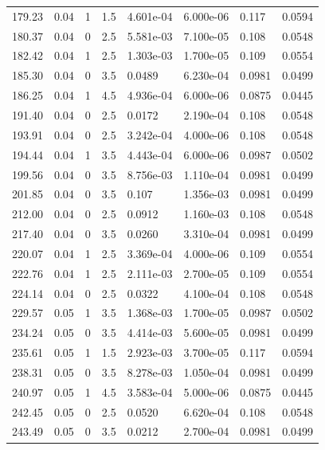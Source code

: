\documentclass[preview]{standalone}
\begin{document}
{{{\begin{tabular}{L{1.2cm}C{1.2cm} C{0.3cm}C{0.5cm} C{1.4cm}C{1.4cm} C{1.4cm}C{1.4cm}}
  179.23  &  0.04  & 1     & 1.5 &  4.601e-04  & 6.000e-06  & 0.117 &  0.0594   \\ 
  180.37  &  0.04  & 0     & 2.5 &  5.581e-03  & 7.100e-05  & 0.108 &  0.0548   \\ 
  182.42  &  0.04  & 1     & 2.5 &  1.303e-03  & 1.700e-05  & 0.109 &  0.0554   \\ 
  185.30  &  0.04  & 0     & 3.5 &  0.0489  & 6.230e-04  & 0.0981 &  0.0499   \\ 
  186.25  &  0.04  & 1     & 4.5 &  4.936e-04  & 6.000e-06  & 0.0875 &  0.0445   \\ 
  191.40  &  0.04  & 0     & 2.5 &  0.0172  & 2.190e-04  & 0.108 &  0.0548   \\ 
  193.91  &  0.04  & 0     & 2.5 &  3.242e-04  & 4.000e-06  & 0.108 &  0.0548   \\ 
  194.44  &  0.04  & 1     & 3.5 &  4.443e-04  & 6.000e-06  & 0.0987 &  0.0502   \\ 
  199.56  &  0.04  & 0     & 3.5 &  8.756e-03  & 1.110e-04  & 0.0981 &  0.0499   \\ 
  201.85  &  0.04  & 0     & 3.5 &  0.107  & 1.356e-03  & 0.0981 &  0.0499   \\ 
  212.00  &  0.04  & 0     & 2.5 &  0.0912  & 1.160e-03  & 0.108 &  0.0548   \\ 
  217.40  &  0.04  & 0     & 3.5 &  0.0260  & 3.310e-04  & 0.0981 &  0.0499   \\ 
  220.07  &  0.04  & 1     & 2.5 &  3.369e-04  & 4.000e-06  & 0.109 &  0.0554   \\ 
  222.76  &  0.04  & 1     & 2.5 &  2.111e-03  & 2.700e-05  & 0.109 &  0.0554   \\ 
  224.14  &  0.04  & 0     & 2.5 &  0.0322  & 4.100e-04  & 0.108 &  0.0548   \\ 
  229.57  &  0.05  & 1     & 3.5 &  1.368e-03  & 1.700e-05  & 0.0987 &  0.0502   \\ 
  234.24  &  0.05  & 0     & 3.5 &  4.414e-03  & 5.600e-05  & 0.0981 &  0.0499   \\ 
  235.61  &  0.05  & 1     & 1.5 &  2.923e-03  & 3.700e-05  & 0.117 &  0.0594   \\ 
  238.31  &  0.05  & 0     & 3.5 &  8.278e-03  & 1.050e-04  & 0.0981 &  0.0499   \\ 
  240.97  &  0.05  & 1     & 4.5 &  3.583e-04  & 5.000e-06  & 0.0875 &  0.0445   \\ 
  242.45  &  0.05  & 0     & 2.5 &  0.0520  & 6.620e-04  & 0.108 &  0.0548   \\ 
  243.49  &  0.05  & 0     & 3.5 &  0.0212  & 2.700e-04  & 0.0981 &  0.0499   \\ 

\end{tabular}}}}
\end{document}
